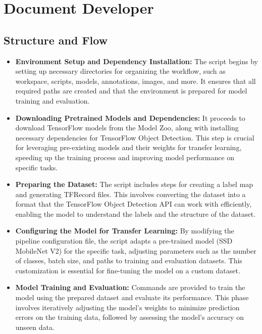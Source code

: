 
%
%

\chapter{Document Developer}
\label{chapter 8}
	
	\section{Structure and Flow}
	
\begin{itemize}
	\item \textbf{Environment Setup and Dependency Installation:} The script begins by setting up necessary directories for organizing the workflow, such as workspace, scripts, models, annotations, images, and more. It ensures that all required paths are created and that the environment is prepared for model training and evaluation.
	
	\item \textbf{Downloading Pretrained Models and Dependencies:} It proceeds to download TensorFlow models from the Model Zoo, along with installing necessary dependencies for TensorFlow Object Detection. This step is crucial for leveraging pre-existing models and their weights for transfer learning, speeding up the training process and improving model performance on specific tasks.
	
	\item \textbf{Preparing the Dataset:} The script includes steps for creating a label map and generating TFRecord files. This involves converting the dataset into a format that the TensorFlow Object Detection API can work with efficiently, enabling the model to understand the labels and the structure of the dataset.
	
	\item \textbf{Configuring the Model for Transfer Learning:} By modifying the pipeline configuration file, the script adapts a pre-trained model (SSD MobileNet V2) for the specific task, adjusting parameters such as the number of classes, batch size, and paths to training and evaluation datasets. This customization is essential for fine-tuning the model on a custom dataset.
	
	\item \textbf{Model Training and Evaluation:} Commands are provided to train the model using the prepared dataset and evaluate its performance. This phase involves iteratively adjusting the model's weights to minimize prediction errors on the training data, followed by assessing the model's accuracy on unseen data.
	

\end{itemize}
